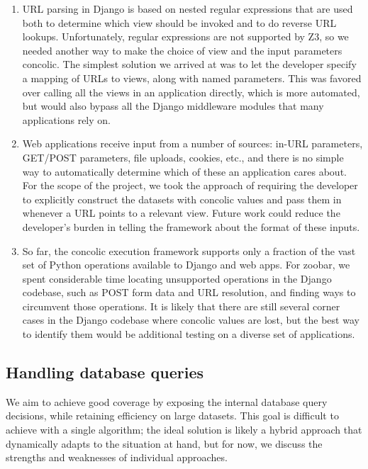 \documentclass{article}
\begin{document}
\begin{enumerate}
\item URL parsing in Django is based on nested regular expressions
  that are used both to determine which view should be invoked and to do reverse URL
lookups.
  Unfortunately, regular expressions are not supported by Z3, so we
  needed another way to make the choice of view and the input
  parameters concolic. The simplest solution we arrived at was to
  let the developer specify a mapping of URLs to views, along with
  named parameters. This was favored over calling all the views in an
  application directly, which is more automated, but would also
  bypass all the Django middleware modules that many applications
  rely on.

\item Web applications receive input from a number of sources: in-URL
  parameters, GET/POST parameters, file uploads, cookies, etc., and
  there is no simple way to automatically determine which of these an
  application cares about. For the scope of the project, we took the
  approach of requiring the developer to explicitly construct the
  datasets with concolic values and pass them in whenever a URL points
  to a relevant view. Future work could reduce the developer's burden
  in telling the framework about the format of these inputs.

\item So far, the concolic execution framework supports only a
  fraction of the vast set of Python operations available to Django
  and web apps. For zoobar, we spent considerable time locating
  unsupported operations in the Django codebase, such as POST form
  data and URL resolution, and finding ways to circumvent those
  operations. It is likely that there are still several corner cases
  in the Django codebase where concolic values are lost, but the best
  way to identify them would be additional testing on a diverse set of
  applications.
\end{enumerate}

\subsection{Handling database queries}

We aim to achieve good coverage
by exposing the internal database query decisions, while retaining
efficiency on large datasets. This goal is difficult to achieve with a single
algorithm; the ideal solution is likely a hybrid approach that dynamically adapts to
the situation at hand, but for now, we discuss the strengths and weaknesses of
individual approaches.
\end{document}
